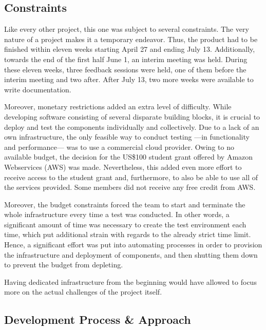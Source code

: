\subsection{Constraints}\label{constraints}

Like every other project, this one was subject to several constraints.
The very nature of a project makes it a temporary endeavor. Thus, the
product had to be finished within eleven weeks starting April 27 and
ending July 13. Additionally, towards the end of the first half June 1,
an interim meeting was held. During these eleven weeks, three feedback
sessions were held, one of them before the interim meeting and two after.
After July 13, two more weeks were available to write documentation.

Moreover, monetary restrictions added an extra level of difficulty.
While developing software consisting of several disparate building
blocks, it is crucial to deploy and test the components individually and
collectively. Due to a lack of an own infrastructure, the only feasible
way to conduct testing ---in functionality and performance--- was to use
a commercial cloud provider. Owing to no available budget, the decision
for the US\$100 student grant offered by Amazon Webservices (AWS) was made.
Nevertheless, this added even more effort to receive access to the
student grant and, furthermore, to also be able to use all of the
services provided. Some members did not receive any free credit from AWS.

Moreover, the budget constraints forced the team to start and terminate
the whole infrastructure every time a test was conducted. In other
words, a significant amount of time was necessary to create the test
environment each time, which put additional strain with regards to
the already strict time limit. Hence, a significant effort was put into
automating processes in order to provision the infrastructure and
deployment of components, and then shutting them down to prevent the
budget from depleting.

Having dedicated infrastructure from the beginning would have allowed to
focus more on the actual challenges of the project itself.

\subsection{Development Process \&
Approach}\label{development-process-approach}

